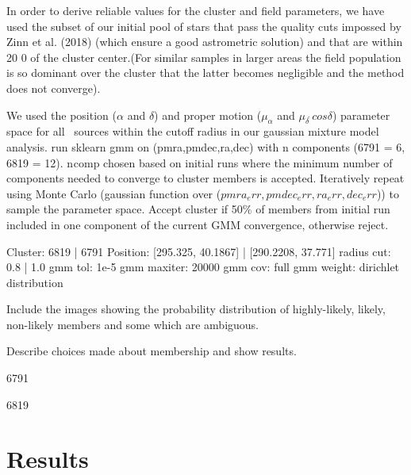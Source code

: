 In order to derive reliable values for the cluster and
field parameters, we have used the subset of our initial
pool of stars that pass the quality cuts impossed by Zinn
et al. (2018) (which ensure a good astrometric solution)
and that are within 20 0 of the cluster center.(For similar samples in larger areas the field population is so dominant over the cluster that the latter becomes negligible and the method does not converge).

We used the position ($\alpha$ and $\delta$) and proper motion ($\mu_{\alpha}$ and $\mu_{\delta}\dot~cos\delta$) parameter space for all \Gaia~sources within the cutoff radius in our gaussian mixture model analysis. 
run sklearn gmm on (pmra,pmdec,ra,dec) with n components (6791 = 6, 6819 = 12). n$_{}$comp chosen based on initial runs where the minimum number of components needed to converge to cluster members is accepted. Iteratively repeat using Monte Carlo (gaussian function over ($pmra_err,pmdec_err,ra_err,dec_err$)) to sample the parameter space. Accept cluster if 50$\%$ of members from initial run included in one component of the current GMM convergence, otherwise reject.

Cluster:	6819 | 6791	
Position:	[295.325, 40.1867] | [290.2208, 37.771]
radius cut:	0.8	| 1.0
gmm tol:	1e-5       
gmm maxiter:	20000      
gmm cov:	full       
gmm weight:	dirichlet distribution

Include the images showing the probability distribution of highly-likely, likely, non-likely members and some which are ambiguous.

Describe choices made about membership and show results.

6791


6819

\section{Results}

\label{sect:cuts}

